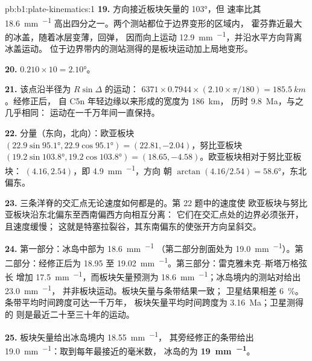 \begin{solution}{pb:b1:plate-kinematics:1}
\textbf{19.} 方向接近板块矢量的 \ang{103}，但
速率比其 \qty{18.6}{mm.^{-1}} 高出四分之一。两个测站都位于边界变形的区域内，
霍芬靠近最大的冰盖，随着冰层变薄，回弹，
因而向上运动
\qty{12.9}{mm.^{-1}}，并沿水平方向背离冰盖运动。
位于边界带内的测站测得的是板块运动加上局地变形。

\textbf{20.} $0.210\times10 = \ang{2.10}$。

\textbf{21.} 该点沿半径为 $R\sin\Delta$ 的运动：
$6371\times0.7944\times(2.10\times\pi/180) = \qty{185.5}{km}$。经修正后，
自 C5n 年轻边缘以来形成的宽度为 \qty{186}{km}，
历时 \qty{9.8}{Ma}，与之几乎相同：
运动在一千万年间一直保持。

\textbf{22.} 分量（东向，北向）：欧亚板块
$(22.9\sin\ang{95.1}, 22.9\cos\ang{95.1}) = (22.81, -2.04)$，努比亚板块
$(19.2\sin\ang{103.8}, 19.2\cos\ang{103.8}) = (18.65, -4.58)$。欧亚板块相对于努比亚板块：
$(4.16, 2.54)$，即 \qty{4.9}{mm.^{-1}}，方向
朝 $\arctan(4.16/2.54) = \ang{58.6}$，东北偏东。

\textbf{23.} 三条洋脊的交汇点无论速度如何都是的。第 22 题中的速度使
欧亚板块与努比亚板块沿东北偏东至西南偏西方向相互分离：
它们在交汇点处的边界必须张开，且速度缓慢；
这就是特塞拉裂谷，其东南偏东的使张开方向呈斜交。

\textbf{24.} 第一部分：冰岛中部为 \qty{18.6}{mm.^{-1}}
（第二部分剖面处为 \qty{19.0}{mm.^{-1}}）。第二部分：经修正后为 18.95 至
\qty{19.02}{mm.^{-1}}。第三部分：雷克雅未克–斯塔万格弦长
增加 \qty{17.5}{mm.^{-1}}，而板块矢量预测为
\qty{18.6}{mm.^{-1}}；冰岛境内的测站对给出 \qty{23.0}{mm.^{-1}}，
并非板块运动。板块矢量与条带结果一致；
卫星结果相差 \qty{6}{\percent}。条带平均时间跨度可达一千万年，
板块矢量平均时间跨度为 \qty{3.16}{Ma}；卫星测得的
则是最近二十至三十年的运动。

\textbf{25.} 板块矢量给出冰岛境内 \qty{18.55}{mm.^{-1}}，
其旁经修正的条带给出 \qty{19.0}{mm.^{-1}}：取到每年最接近的毫米数，
冰岛的为
\textbf{\qty[text-series-to-math=true]{19}{mm.^{-1}}}。
\end{solution}
